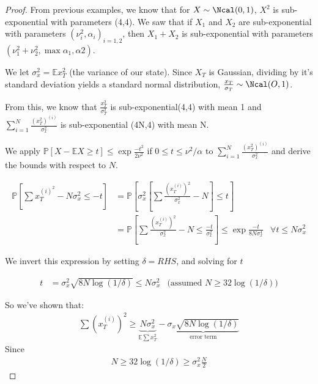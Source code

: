 \documentclass{article}[12pt]
\def \E{\mathbb E}
\def \P{\mathbb P}
\begin{document}
\begin{proof}
	
	From previous examples, we know that for $X\sim \Ncal(0,1)$, $X^2$ is sub-exponential with parameters (4,4). 
	We saw that if $X_1$ and $X_2$ are sub-exponential with parameters $(\nu^2_i, \alpha_i)_{i=1,2}$, then $X_1 +X_2$ is sub-exponential with parameters $(\nu_1^2 + \nu_2^2, \max{\alpha_1, \alpha2})$. 
	
	We let $\sigma_x^2 = \E x^2_T$ (the variance of our state).
	Since $X_T$ is Gaussian, dividing by it's standard deviation yields a standard normal distribution, 
	$
	\frac{x_T}{\sigma_T} \sim \Ncal(O,1)
	$.
	
	From this, we know that
	$\frac{x^2_T}{\sigma^2_T}$ is sub-exponential(4,4) with mean 1 and 
	$\sum_{i=1}^{N}\frac{(x^2_T)^(i)}{\sigma^2_x}$ is sub-exponential (4N,4) with mean N.
	
	We apply $\P[X-\E X \geq t] \leq \exp{\frac{-t^2}{2\nu^2}}$  if $0 \leq t \leq \nu^2/\alpha$ to $\sum_{i=1}^{N}\frac{(x^2_T)^{(i)}}{\sigma^2_x}$ and derive the bounds with respect to $N$. 
	
	\begin{align*}
	\P \left[ \sum x_T^{(i)^2} - N \sigma_x^2 \leq -t\right]
	&= \P \left[\sigma_x^2 \left[\sum\frac{(x_T^{(i)})^2}{\sigma_x^2} - N\right] \leq t\right] \\
	&= \P \left[\sum\frac{(x_T^{(i)})^2}{\sigma_x^2} - N \leq \frac{-t}{\sigma_x^2} \right] \leq \exp{\frac{-t}{8N\sigma_x^4}} & \forall t \leq N\sigma_x^2
	\end{align*}
	
	We invert this expression by setting $\delta = RHS$, and solving for $t$
	
	\begin{align*}
	t &= \sigma_x^2 \sqrt{8N\log(1/\delta)} \leq N\sigma_x^2 &\text{(assumed $N \geq 32 \log(1/\delta)$)}
	\end{align*}
	
	So we've shown that:
	\begin{align*}
	\sum \left(x_T^{(i)}\right)^2 \geq \underbrace{N\sigma_x^2}_{\E \sum x_T^2} - \underbrace{\sigma_x\sqrt{8N\log(1/\delta)}	}_{\text{error term}}
	\end{align*}
	Since
	\begin{align*}
	N \geq 32\log(1/\delta) \geq \sigma_x^2 \frac{N}{2}
	\end{align*}
\end{proof}
\end{document}

